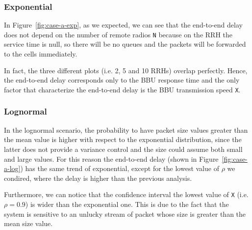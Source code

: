 \documentclass[11pt,a4paper,oneside, openright]{article}
\begin{document}
\subsubsection{Exponential}
In Figure~\ref{fig:case-a-exp}, as we expected, we can see that the end-to-end delay does not depend on the number of remote radios \texttt{N} because on the RRH the service time is null, so there will be no queues and the packets will be forwarded to the cells immediately.

In fact, the three different plots (i.e. 2, 5 and 10 RRHs) overlap perfectly.
Hence, the end-to-end delay corresponds only to the BBU response time and the only factor that characterize the end-to-end delay is the BBU transmission speed \texttt{X}.


\subsubsection{Lognormal}
In the lognormal scenario, the probability to have packet size values greater than the mean value is higher with respect to the exponential distribution, since the latter does not provide a variance control and the size could assume both small and large values. For this reason the end-to-end delay (shown in Figure~\ref{fig:case-a-log}) has the same trend of exponential, except for the lowest value of $ \rho $ we condired, where the delay is higher than the previous analysis.

Furthermore, we can notice that the confidence interval the lowest value of \texttt{X} (i.e. $\rho = 0.9$) is wider than the exponential one. This is due to the fact that the system is sensitive to an unlucky stream of packet whose size is greater than the mean size value.
\end{document}

